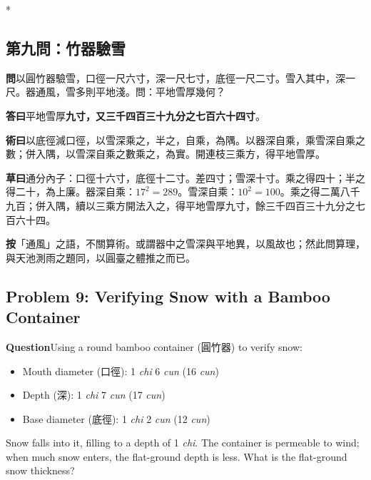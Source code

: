 \documentclass[11pt,a4paper]{article}
\newcommand{\WenCN}{\textbf{\color{headcolor}問}}
\newcommand{\DaCN}{\textbf{\color{headcolor}答曰}}
\newcommand{\ShuCN}{\textbf{\color{headcolor}術曰}}
\newcommand{\CaoCN}{\textbf{\color{headcolor}草曰}}
\newcommand{\AnCN}{\textbf{\color{headcolor}按}}
\newcommand{\WenEN}{\textbf{\color{headcolor}Question}}
\begin{document}
\newpage

\switchcolumn[0]*
\subsection*{第九問：竹器驗雪}

\vspace{0.5em}
\WenCN{}\quad 以圓竹器驗雪，口徑一尺六寸，深一尺七寸，底徑一尺二寸。雪入其中，深一尺。器通風，雪多則平地淺。問：平地雪厚幾何？

\vspace{0.5em}
\DaCN{}\quad 平地雪厚\textbf{九寸，又三千四百三十九分之七百六十四寸}。

\vspace{0.5em}
\ShuCN{}\quad 以底徑減口徑，以雪深乘之，半之，自乘，為隅。以器深自乘，乘雪深自乘之數；併入隅，以雪深自乘之數乘之，為實。開連枝三乘方，得平地雪厚。

\vspace{0.5em}
\CaoCN{}\quad 通分內子：口徑十六寸，底徑十二寸。差四寸；雪深十寸。乘之得四十；半之得二十，為上廉。器深自乘：$17^2 = 289$。雪深自乘：$10^2 = 100$。乘之得二萬八千九百；併入隅，續以三乘方開法入之，得平地雪厚九寸，餘三千四百三十九分之七百六十四。

\vspace{0.5em}
\AnCN{}\quad「通風」之語，不關算術。或謂器中之雪深與平地異，以風故也；然此問算理，與天池測雨之題同，以圓臺之體推之而已。

\switchcolumn[1]
\subsection*{Problem 9: Verifying Snow with a Bamboo Container}
\label{sec:zhuqiyanxue}

\vspace{0.5em}
\WenEN{}\quad Using a round bamboo container (圓竹器) to verify snow:
\begin{itemize}[noitemsep,topsep=0pt]
  \item Mouth diameter (口徑): 1 \textit{chi} 6 \textit{cun} (16 \textit{cun})
  \item Depth (深): 1 \textit{chi} 7 \textit{cun} (17 \textit{cun})
  \item Base diameter (底徑): 1 \textit{chi} 2 \textit{cun} (12 \textit{cun})
\end{itemize}
Snow falls into it, filling to a depth of 1 \textit{chi}. The container is permeable to wind; when much snow enters, the flat-ground depth is less. What is the flat-ground snow thickness?
\end{document}
